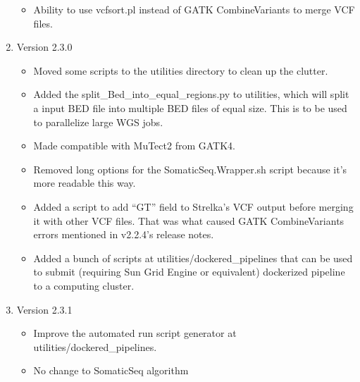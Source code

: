 \documentclass[10pt,letterpaper]{article}
\begin{document}
\begin{sloppypar}
\begin{enumerate}
\begin{itemize}
		  \item
		  Ability to use vcfsort.pl instead of GATK CombineVariants to merge VCF files.
		
		\end{itemize}
	
	
	
	\item Version 2.3.0
	
		\begin{itemize}
		  
		  \item
		  Moved some scripts to the utilities directory to clean up the clutter.
		  
		  \item
		  Added the split\_Bed\_into\_equal\_regions.py to utilities, which will split a input BED file into multiple BED files of equal size. This is to be used to parallelize large WGS jobs.
		  
		  \item
		  Made compatible with MuTect2 from GATK4.
		  
		  \item
		  Removed long options for the SomaticSeq.Wrapper.sh script because it's more readable this way.
		  
		  \item
		  Added a script to add ``GT'' field to Strelka's VCF output before merging it with other VCF files. That was what caused GATK CombineVariants errors mentioned in v2.2.4's release notes. 
		  
		  \item
		  Added a bunch of scripts at utilities/dockered\_pipelines that can be used to submit (requiring Sun Grid Engine or equivalent) dockerized pipeline to a computing cluster. 
		
		\end{itemize}
	
	
	
	\item Version 2.3.1
	
		\begin{itemize}
		
		  \item
		  Improve the automated run script generator at utilities/dockered\_pipelines.
		  
		  \item
		  No change to SomaticSeq algorithm
		
		\end{itemize}
	

\end{enumerate}
\end{sloppypar}
\end{document}
